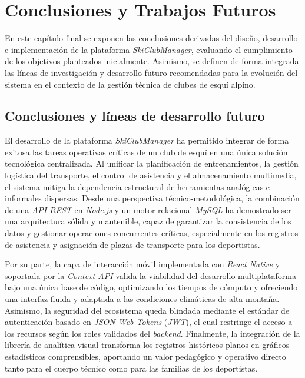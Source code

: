 \chapter{Conclusiones y Trabajos Futuros}
\label{cap:conclusiones_trabajos_futuros}

En este capítulo final se exponen las conclusiones derivadas del diseño, desarrollo e implementación de la plataforma \textit{SkiClubManager}, evaluando el cumplimiento de los objetivos planteados inicialmente. Asimismo, se definen de forma integrada las líneas de investigación y desarrollo futuro recomendadas para la evolución del sistema en el contexto de la gestión técnica de clubes de esquí alpino.

\section{Conclusiones y líneas de desarrollo futuro}

El desarrollo de la plataforma \textit{SkiClubManager} ha permitido integrar de forma exitosa las tareas operativas críticas de un club de esquí en una única solución tecnológica centralizada. Al unificar la planificación de entrenamientos, la gestión logística del transporte, el control de asistencia y el almacenamiento multimedia, el sistema mitiga la dependencia estructural de herramientas analógicas e informales dispersas. Desde una perspectiva técnico-metodológica, la combinación de una \textit{API REST} en \textit{Node.js} y un motor relacional \textit{MySQL} ha demostrado ser una arquitectura sólida y mantenible, capaz de garantizar la consistencia de los datos y gestionar operaciones concurrentes críticas, especialmente en los registros de asistencia y asignación de plazas de transporte para los deportistas.

Por su parte, la capa de interacción móvil implementada con \textit{React Native} y soportada por la \textit{Context API} valida la viabilidad del desarrollo multiplataforma bajo una única base de código, optimizando los tiempos de cómputo y ofreciendo una interfaz fluida y adaptada a las condiciones climáticas de alta montaña. Asimismo, la seguridad del ecosistema queda blindada mediante el estándar de autenticación basado en \textit{JSON Web Tokens} (\textit{JWT}), el cual restringe el acceso a los recursos según los roles validados del \textit{backend}. Finalmente, la integración de la librería de analítica visual transforma los registros históricos planos en gráficos estadísticos comprensibles, aportando un valor pedagógico y operativo directo tanto para el cuerpo técnico como para las familias de los deportistas.

